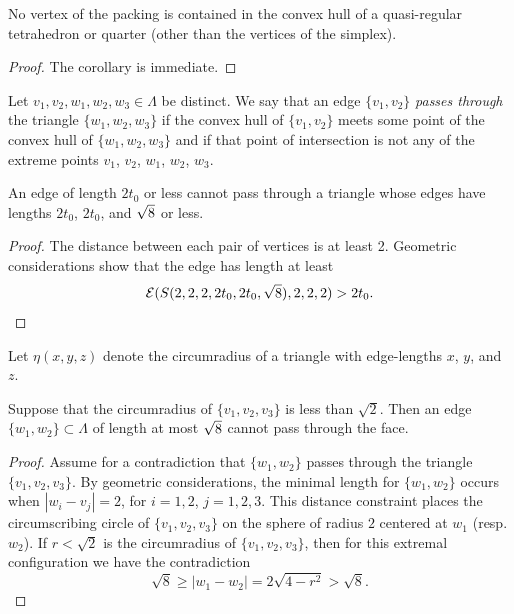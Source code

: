 \bigskip
\begin{corollary}\label{cor:interior}
No vertex of the packing is contained in the convex hull of a
quasi-regular tetrahedron or quarter (other than the vertices of
the simplex).
\end{corollary}

\begin{proof}
The corollary is immediate.
\end{proof}


\begin{definition} \label{def:passes-through}
Let $v_1,v_2,w_1,w_2,w_3\in\Lambda$ be distinct.  We say that an
edge $\{v_1,v_2\}$ {\it passes through} the triangle
$\{w_1,w_2,w_3\}$ if the convex hull of $\{v_1,v_2\}$ meets some
point of the convex hull of $\{w_1,w_2,w_3\}$ and if that point of
intersection is not any of the extreme points $v_1$, $v_2$, $w_1$,
$w_2$, $w_3$.
%
\end{definition}

\begin{lemma} \label{lemma:2t0-doesnt-pass-through}
An edge of length $2t_0$ or less cannot pass through a triangle
whose edges have lengths $2t_0$, $2t_0$, and $\sqrt8$ or less.
\end{lemma}

\begin{proof}  The distance between each pair of vertices is at least 2.
Geometric considerations show that the edge has length at least
$${{\mathcal E}}(S(2,2,2,2t_0,2t_0,\sqrt8),2,2,2) > 2t_0.$$
\end{proof}

\begin{definition}\label{def:eta}
%
Let $\eta(x,y,z)$ denote the circumradius of a
triangle with edge-lengths $x$, $y$, and $z$.
\end{definition}


\begin{lemma}
\label{lemma:no-pass-sqrt2}
Suppose that the circumradius of $\{v_1,v_2,v_3\}$ is less than
$\sqrt2$. Then an edge $\{w_1,w_2\}\subset\Lambda$ of length at
most $\sqrt8$ cannot pass through the face.
\end{lemma}

\begin{proof}  Assume for a contradiction that $\{w_1,w_2\}$ passes through the
triangle $\{v_1,v_2,v_3\}$.   By geometric considerations, the
minimal length for $\{w_1,w_2\}$ occurs when $|w_i-v_j|=2$, for
$i=1,2$, $j=1,2,3$.  This distance constraint places the
circumscribing circle of $\{v_1,v_2,v_3\}$ on the sphere of radius
$2$ centered at $w_1$ (resp. $w_2$).  If $r<\sqrt2$ is the
circumradius of $\{v_1,v_2,v_3\}$, then for this extremal
configuration we have the contradiction
    $$\sqrt8\ge |w_1-w_2| = 2\sqrt{4-r^2}>\sqrt8.$$
\end{proof}


